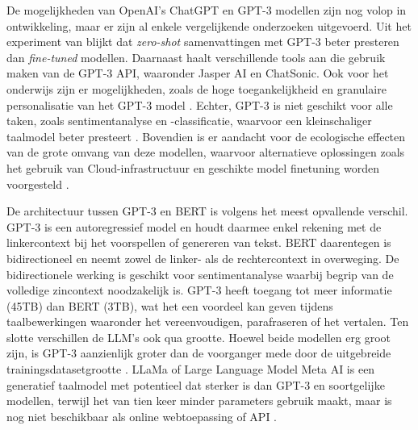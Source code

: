 \medspace

De mogelijkheden van OpenAI's ChatGPT en GPT-3 modellen zijn nog volop in ontwikkeling, maar er zijn al enkele vergelijkende onderzoeken uitgevoerd. Uit het experiment van \textcite{Goyal2022} blijkt dat \textit{zero-shot} samenvattingen met GPT-3 beter presteren dan \textit{fine-tuned} modellen. Daarnaast haalt \textcite{Mottesi2023} verschillende tools aan die gebruik maken van de GPT-3 API, waaronder Jasper AI en ChatSonic. Ook voor het onderwijs zijn er mogelijkheden, zoals de hoge toegankelijkheid en granulaire personalisatie van het GPT-3 model \autocite{Roose2023, Garg2022}. Echter, GPT-3 is niet geschikt voor alle taken, zoals sentimentanalyse en -classificatie, waarvoor een kleinschaliger taalmodel beter presteert \autocite{Li2022}. Bovendien is er aandacht voor de ecologische effecten van de grote omvang van deze modellen, waarvoor alternatieve oplossingen zoals het gebruik van Cloud-infrastructuur en geschikte model finetuning worden voorgesteld \autocite{Strubell2019, Simon2021}.

\medspace

De architectuur tussen GPT-3 en BERT is volgens \textcite{Mottesi2023} het meest opvallende verschil. GPT-3 is een autoregressief model en houdt daarmee enkel rekening met de linkercontext bij het voorspellen of genereren van tekst. BERT daarentegen is bidirectioneel en neemt zowel de linker- als de rechtercontext in overweging. De bidirectionele werking is geschikt voor sentimentanalyse waarbij begrip van de volledige zincontext noodzakelijk is. GPT-3 heeft toegang tot meer informatie (45TB) dan BERT (3TB), wat het een voordeel kan geven tijdens taalbewerkingen waaronder het vereenvoudigen, parafraseren of het vertalen. Ten slotte verschillen de LLM's ook qua grootte. Hoewel beide modellen erg groot zijn, is GPT-3 aanzienlijk groter dan de voorganger mede door de uitgebreide trainingsdatasetgrootte \autocite{Brown2020}. LLaMa of Large Language Model Meta AI is een generatief taalmodel met potentieel dat sterker is dan GPT-3 en soortgelijke modellen, terwijl het van tien keer minder parameters gebruik maakt, maar is nog niet beschikbaar als online webtoepassing of API \autocite{Hern2023, Touvron2023}.


